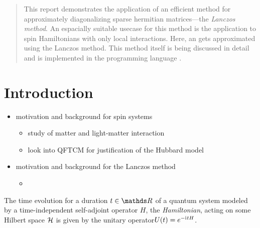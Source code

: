 
\begin{abstract}
    This report demonstrates the application of an efficient method for approximately diagonalizing sparse hermitian matrices---the \emph{Lanczos method}.
    An espacially suitable usecase for this method is the application to spin Hamiltonians with only local interactions. 
    Here, an  gets approximated using the Lanczos method.
    This method itself is being discussed in detail and is implemented in the programming language .
\end{abstract}

\section{Introduction}

\begin{itemize}
    \item motivation and background for spin systems
    \begin{itemize}
        \item study of matter and light-matter interaction
        \item look into QFTCM for justification of the Hubbard model
    \end{itemize}
    \item motivation and background for the Lanczos method
    \begin{itemize}
        \item 
    \end{itemize}
\end{itemize}


The time evolution for a duration \(t\in\R\) of a quantum system modeled by a time-independent self-adjoint operator \(H\), the \emph{Hamiltonian}, acting on some Hilbert space \(\mathcal{H}\) is given by the unitary operator\footnotemark \(U(t) = e^{-\mathrm{i}\mkern1mu t H}\).




